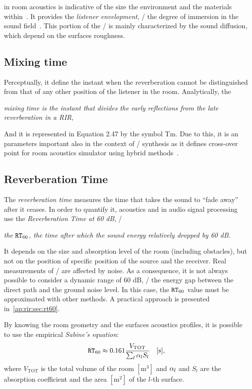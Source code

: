  in room acoustics is indicative of the size the environment and the materials within~\cite{valimaki2016more}.
It provides the \textit{listener envelopment}, \ie/ the degree of immersion in the sound field~\cite{griesinger1997psychoacoustics}.
This portion of the \RIR/ is mainly characterized by the sound diffusion, which depend on the surfaces roughness.

\subsection{Mixing time}
Perceptually, it define the instant when the reverberation cannot be distinguished from that of any other position of the listener in the room.
Analytically,  the
\begin{center}
    \textit{\emph{mixing time} is the instant that divides the early reflections from the late reverberation in a RIR},
\end{center}
And it is represented in Equation 2.47 by the symbol Tm.
Due to this, it is an parameters important also in the context of \RIRs/ synthesis as it defines cross-over point for room acoustics simulator using hybrid methods~.

\subsection{Reverberation Time}
The \textit{reverberation time} measures the time that takes the sound to ``fade away'' after it ceases.
In order to quantify it, acoustics and in audio signal processing use the \textit{Reverberation Time at 60 dB}, \ie/
\begin{center}
    \textit{the $\mathtt{RT}_{60}$, the time after which the sound energy relatively dropped by 60 dB.}
\end{center}
It depends on the size and absorption level of the room (including obstacles), but not on the position of specific position of the source and the receiver.
Real measurements of \RIRs/ are affected by noise.
As a consequence, it is not always possible to consider a dynamic range of 60 dB,
\ie/ the energy gap between the direct path and the ground noise level.
In this case, the $\mathtt{RT}_{60}$ value must be approximated with other methods.
A practical approach is presented in~\cref{ap:rir:sec:rt60}.

By knowing the room geometry and the surfaces acoustics profiles,
it is possible to use the empirical \textit{Sabine's equation}:
\begin{equation}
    \mathtt{RT}_{60}
    \approx 0.161 \frac{V_{\text{TOT}}}{\sum_l \alpha_l S_l} \hspace{1em} [\si{\second}]
    ,
\end{equation}
where $V_{\text{TOT}}$ is the total volume of the room $[\si{\metre^3}]$ and $\alpha_l$ and $S_l$ are the
absorption coefficient and the area $[\si{\metre^2}]$  of the $l$-th surface.

